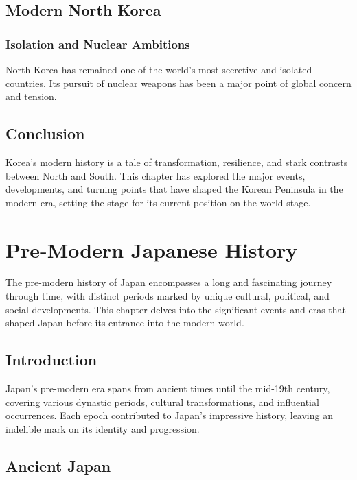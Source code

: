 \documentclass{book}
\begin{document}
\section{Modern North Korea}
\label{sec:modern-north-korea}

\subsection{Isolation and Nuclear Ambitions}
\label{subsec:isolation-nuclear-ambitions}
North Korea has remained one of the world’s most secretive and isolated countries. Its pursuit of nuclear weapons has been a major point of global concern and tension.

\section{Conclusion}
\label{sec:conclusion-modern-korea}
Korea’s modern history is a tale of transformation, resilience, and stark contrasts between North and South. This chapter has explored the major events, developments, and turning points that have shaped the Korean Peninsula in the modern era, setting the stage for its current position on the world stage.

\chapter{Pre-Modern Japanese History}
\label{ch:pre-modern-japanese-history}

The pre-modern history of Japan encompasses a long and fascinating journey through time, with distinct periods marked by unique cultural, political, and social developments. This chapter delves into the significant events and eras that shaped Japan before its entrance into the modern world.

\section{Introduction}
\label{sec:introduction-pre-modern-japan}
Japan's pre-modern era spans from ancient times until the mid-19th century, covering various dynastic periods, cultural transformations, and influential occurrences. Each epoch contributed to Japan's impressive history, leaving an indelible mark on its identity and progression.

\section{Ancient Japan}
\label{sec:ancient-japan}
\end{document}
